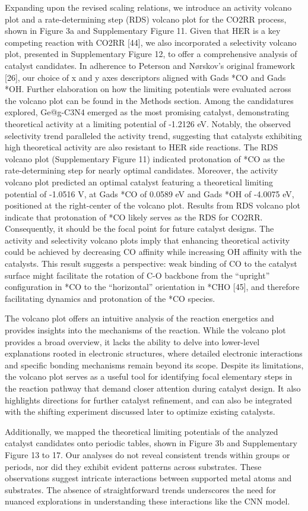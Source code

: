 Expanding upon the revised scaling relations, we introduce an activity volcano plot and a rate-determining step (RDS) volcano plot for the CO2RR process, shown in Figure 3a and Supplementary Figure 11. Given that HER is a key competing reaction with CO2RR [44], we also incorporated a selectivity volcano plot, presented in Supplementary Figure 12, to offer a comprehensive analysis of catalyst candidates. In adherence to Peterson and Nørskov’s original framework [26], our choice of x and y axes descriptors aligned with Gads *CO and Gads *OH. Further elaboration on how the limiting potentials were evaluated across the volcano plot can be found in the Methods section. Among the candidatures explored, Ge@g-C3N4 emerged as the most promising catalyst, demonstrating theoretical activity at a limiting potential of -1.2126 eV. Notably, the observed selectivity trend paralleled the activity trend, suggesting that catalysts exhibiting high theoretical activity are also resistant to HER side reactions. The RDS volcano plot (Supplementary Figure 11) indicated protonation of *CO as the rate-determining step for nearly optimal candidates. Moreover, the activity volcano plot predicted an optimal catalyst featuring a theoretical limiting potential of -1.0516 V, at Gads *CO of 0.0589 eV and Gads *OH of -4.0075 eV, positioned at the right-center of the volcano plot. Results from RDS volcano plot indicate that protonation of *CO likely serves as the RDS for CO2RR. Consequently, it should be the focal point for future catalyst designs. The activity and selectivity volcano plots imply that enhancing theoretical activity could be achieved by decreasing CO affinity while increasing OH affinity with the catalysts. This result suggests a perspective: weak binding of CO to the catalyst surface might facilitate the rotation of C-O backbone from the “upright” configuration in *CO to the “horizontal” orientation in *CHO [45], and therefore facilitating dynamics and protonation of the *CO species.

The volcano plot offers an intuitive analysis of the reaction energetics and provides insights into the mechanisms of the reaction. While the volcano plot provides a broad overview, it lacks the ability to delve into lower-level explanations rooted in electronic structures, where detailed electronic interactions and specific bonding mechanisms remain beyond its scope. Despite its limitations, the volcano plot serves as a useful tool for identifying focal elementary steps in the reaction pathway that demand closer attention during catalyst design. It also highlights directions for further catalyst refinement, and can also be integrated with the shifting experiment discussed later to optimize existing catalysts.

Additionally, we mapped the theoretical limiting potentials of the analyzed catalyst candidates onto periodic tables, shown in Figure 3b and Supplementary Figure 13 to 17. Our analyses do not reveal consistent trends within groups or periods, nor did they exhibit evident patterns across substrates. These observations suggest intricate interactions between supported metal atoms and substrates. The absence of straightforward trends underscores the need for nuanced explorations in understanding these interactions like the CNN model.

